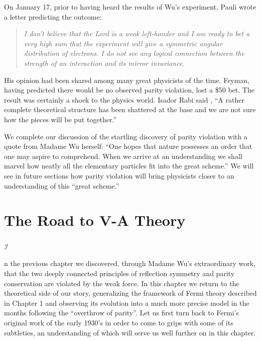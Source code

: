 \documentclass[a4paper,12pt]{book}
\begin{document}
On January 17, prior to having heard the results of Wu's experiment, Pauli wrote a letter predicting the outcome\cite{pauli;letter}:

\begin{quote}
\textit{
I don't believe that the Lord is a weak left-hander and I am ready to bet a very high sum that the experiment will give a symmetric angular distribution of electrons. I do not see any logical connection between the strength of an interaction and its mirror invariance.
}
\end{quote}

His opinion had been shared among many great physicists of the time. Feyman, having predicted there would be no observed parity violation, lost a \$50 bet. The result was certainly a shock to the physics world. Isador Rabi said \cite{gardner}, ``A rather complete theoretical structure has been shattered at the base and we are not sure how the pieces will be put together.''

We complete our discussion of the startling discovery of parity violation with a quote from Madame Wu herself: ``One hopes that nature possesses an order that one may aspire to comprehend. When we arrive at an understanding we shall marvel how neatly all the elementary particles fit into the great scheme.'' We will see in future sections how parity violation will bring physicists closer to an understanding of this ``great scheme.''

\chapter{The Road to V-A Theory}

\paragraph{}\begin{Large}$\mathcal{I}$\end{Large}n the previous chapter we discovered, through Madame Wu's extraordinary work, that the two deeply connected principles of reflection symmetry and parity conservation are violated by the weak force. In this chapter we return to the theoretical side of our story, generalizing the framework of Fermi theory described in Chapter 1 and observing its evolution into a much more precise model in the months following the ``overthrow of parity''. Let us first turn back to Fermi's original work of the early 1930's in order to come to grips with some of its subtleties, an understanding of which will serve us well further on in this chapter.
\end{document}
